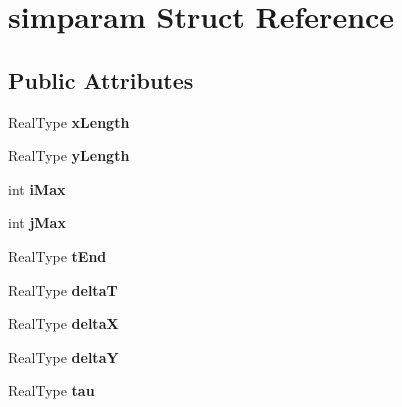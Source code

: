 \hypertarget{structsimparam}{\section{simparam Struct Reference}
\label{structsimparam}
}
\subsection*{Public Attributes}
\begin{DoxyCompactItemize}
\item 
\hypertarget{structsimparam_a9085b58f151d092abdaa2615f2164d05}{Real\-Type {\bfseries x\-Length}}\label{structsimparam_a9085b58f151d092abdaa2615f2164d05}

\item 
\hypertarget{structsimparam_a7eeef58300dc055d389c22317f916c17}{Real\-Type {\bfseries y\-Length}}\label{structsimparam_a7eeef58300dc055d389c22317f916c17}

\item 
\hypertarget{structsimparam_a6c4798be7201c1f4755479c0331a5a6e}{int {\bfseries i\-Max}}\label{structsimparam_a6c4798be7201c1f4755479c0331a5a6e}

\item 
\hypertarget{structsimparam_a34a0316231f7ea9c7288f8c01068306a}{int {\bfseries j\-Max}}\label{structsimparam_a34a0316231f7ea9c7288f8c01068306a}

\item 
\hypertarget{structsimparam_a85b2117b30e705cc4d2ec4ebea8d0869}{Real\-Type {\bfseries t\-End}}\label{structsimparam_a85b2117b30e705cc4d2ec4ebea8d0869}

\item 
\hypertarget{structsimparam_a4373b3894a4bfd70e548948ca94fe8c9}{Real\-Type {\bfseries delta\-T}}\label{structsimparam_a4373b3894a4bfd70e548948ca94fe8c9}

\item 
\hypertarget{structsimparam_afe9e29315ab1270fcd0f834a40d8e592}{Real\-Type {\bfseries delta\-X}}\label{structsimparam_afe9e29315ab1270fcd0f834a40d8e592}

\item 
\hypertarget{structsimparam_a2216572c413dadb8ac43bfc376b83997}{Real\-Type {\bfseries delta\-Y}}\label{structsimparam_a2216572c413dadb8ac43bfc376b83997}

\item 
\hypertarget{structsimparam_a0787a7277fb5c18565acf47561c6e259}{Real\-Type {\bfseries tau}}\label{structsimparam_a0787a7277fb5c18565acf47561c6e259}


\end{DoxyCompactItemize}
